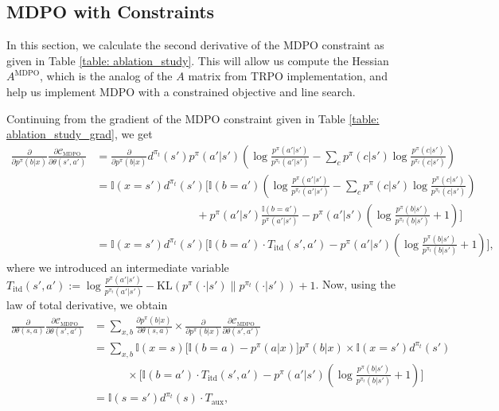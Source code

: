 \documentclass[a4paper, 10pt]{article}
\begin{document}
\subsection{MDPO with Constraints}
In this section, we calculate the second derivative of the MDPO constraint as given in Table \ref{table: ablation_study}. This will allow us compute the Hessian $A^{\text{MDPO}}$, which is the analog of the $A$ matrix from TRPO implementation, and help us implement MDPO with a constrained objective and line search.

Continuing from the gradient of the MDPO constraint given in Table \ref{table: ablation_study_grad}, we get
\begin{align}
  \frac{\partial}{\partial p^\pi(b | x)} \frac{\partial \mathcal{C}_{\text{MDPO}}}{\partial \theta(s', a')} &= \frac{\partial}{\partial p^\pi(b | x)} d^{\pi_t}(s') p^\pi(a' | s') \left( \log \frac{p^\pi(a' | s')}{p^{\pi_t}(a' | s')} - \sum_c p^\pi(c | s') \log \frac{p^\pi(c | s')}{p^{\pi_t}(c | s')} \right) \nonumber \\
  &= \mathbb{I}(x = s') d^{\pi_t}(s') \Bigg[ \mathbb{I}(b = a') \left( \log \frac{p^\pi(a' | s')}{p^{\pi_t}(a' | s')} - \sum_c p^\pi(c | s') \log \frac{p^\pi(c | s')}{p^{\pi_t}(c | s')} \right) \nonumber \\
    & \qquad \qquad \qquad \qquad \quad + p^\pi(a' | s') \frac{\mathbb{I}(b = a')}{p^\pi(a' | s')} - p^\pi(a' | s') \left( \log \frac{p^\pi(b | s')}{p^{\pi_t}(b | s')} + 1 \right) \Bigg] \nonumber \\
  &= \mathbb{I}(x = s') d^{\pi_t}(s') \Bigg[ \mathbb{I}(b = a') \cdot T_{\text{itd}}(s', a') - p^\pi(a' | s') \left( \log \frac{p^\pi(b | s')}{p^{\pi_t}(b | s')} + 1 \right) \Bigg],
\end{align}
where we introduced an intermediate variable $T_{\text{itd}}(s', a') := \log \frac{p^\pi(a' | s')}{p^{\pi_t}(a' | s')} - \text{KL} ( p^\pi(\cdot | s') \| p^{\pi_t}(\cdot | s') ) + 1$. Now, using the law of total derivative, we obtain
\begin{align}
  \frac{\partial}{\partial \theta(s, a)} \frac{\partial \mathcal{C}_{\text{MDPO}}}{\partial \theta(s', a')} &= \sum_{x, b} \frac{\partial p^\pi(b | x)}{\partial \theta(s, a)} \times \frac{\partial}{\partial p^\pi(b | x)} \frac{\partial \mathcal{C}_{\text{MDPO}}}{\partial \theta(s', a')} \nonumber \\
  &= \sum_{x, b} \mathbb{I}(x = s) \Big[ \mathbb{I}(b = a) - p^\pi(a | x) \Big] p^\pi(b | x) \times \mathbb{I}(x = s') d^{\pi_t}(s') \nonumber \\
  & \qquad \quad \times \Bigg[ \mathbb{I}(b = a') \cdot T_{\text{itd}}(s', a') - p^\pi(a' | s') \left( \log \frac{p^\pi(b | s')}{p^{\pi_t}(b | s')} + 1 \right) \Bigg] \nonumber \\
  &= \mathbb{I}(s = s') d^{\pi_t}(s) \cdot T_{\text{aux}},
\end{align}
\end{document}
